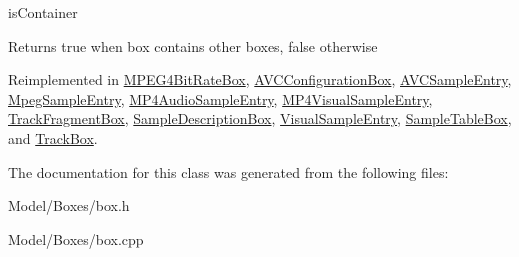 is\-Container 

\begin{DoxyReturn}{Returns}
true when box contains other boxes, false otherwise 
\end{DoxyReturn}


Reimplemented in \hyperlink{class_m_p_e_g4_bit_rate_box_aafb5c5fe09ef9afbfe91e3cc5ce0ff5d}{M\-P\-E\-G4\-Bit\-Rate\-Box}, \hyperlink{class_a_v_c_configuration_box_a626fddbe3ea41877e8a8e97335948339}{A\-V\-C\-Configuration\-Box}, \hyperlink{class_a_v_c_sample_entry_ae0627e8954e878a70c9a67e337fd5d26}{A\-V\-C\-Sample\-Entry}, \hyperlink{class_mpeg_sample_entry_a264a9e2915c1a17f5c7e4ff7f59dab47}{Mpeg\-Sample\-Entry}, \hyperlink{class_m_p4_audio_sample_entry_a17ffcfa7b17574ed19bd38ccab77f705}{M\-P4\-Audio\-Sample\-Entry}, \hyperlink{class_m_p4_visual_sample_entry_aa683a32a4491a554bfc03b0fe1197bfc}{M\-P4\-Visual\-Sample\-Entry}, \hyperlink{class_track_fragment_box_a49538cd7fe1c888203eab7cee5cfb08c}{Track\-Fragment\-Box}, \hyperlink{class_sample_description_box_a227a7ad2f2d282a14cdbbed065fecfa5}{Sample\-Description\-Box}, \hyperlink{class_visual_sample_entry_a212a8d19ecf3236a8951c0161a85a72d}{Visual\-Sample\-Entry}, \hyperlink{class_sample_table_box_ad104b1eb63f6ce7926bbc7cee83fd29f}{Sample\-Table\-Box}, and \hyperlink{class_track_box_a9e3d52a20872169fc6f29c09f1e2ce95}{Track\-Box}.



The documentation for this class was generated from the following files\-:\begin{DoxyCompactItemize}
\item 
Model/\-Boxes/box.\-h\item 
Model/\-Boxes/box.\-cpp\end{DoxyCompactItemize}
